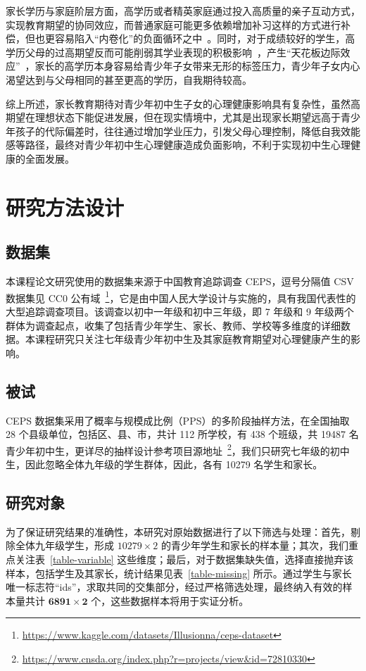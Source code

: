 \documentclass[zihao = -4, linespread = 1.5]{article}
\begin{document}
家长学历与家庭阶层方面，高学历或者精英家庭通过投入高质量的亲子互动方式，实现教育期望的协同效应，而普通家庭可能更多依赖增加补习这样的方式进行补偿，但也更容易陷入“内卷化”的负面循环之中~\citep{WangJianWu}。同时，对于成绩较好的学生，高学历父母的过高期望反而可能削弱其学业表现的积极影响~\citep{LiJiaZhe}，产生“天花板边际效应”~\citep{Tichenor}，家长的高学历本身容易给青少年子女带来无形的标签压力，青少年子女内心渴望达到与父母相同的甚至更高的学历，自我期待较高。

综上所述，家长教育期待对青少年初中生子女的心理健康影响具有复杂性，虽然高期望在理想状态下能促进发展，但在现实情境中，尤其是出现家长期望远高于青少年孩子的代际偏差时，往往通过增加学业压力，引发父母心理控制，降低自我效能感等路径，最终对青少年初中生心理健康造成负面影响，不利于实现初中生心理健康的全面发展。



\section{研究方法设计}
\subsection{数据集}
本课程论文研究使用的数据集来源于中国教育追踪调查 CEPS，逗号分隔值 CSV 数据集见 CC0 公有域~\footnote{\href{https://www.kaggle.com/datasets/illusionna/ceps-dataset}{https://www.kaggle.com/datasets/Illusionna/ceps-dataset}}，它是由中国人民大学设计与实施的，具有我国代表性的大型追踪调查项目。该调查以初中一年级和初中三年级，即 7 年级和 9 年级两个群体为调查起点，收集了包括青少年学生、家长、教师、学校等多维度的详细数据。本课程研究只关注七年级青少年初中生及其家庭教育期望对心理健康产生的影响。



\subsection{被试}
CEPS 数据集采用了概率与规模成比例（PPS）的多阶段抽样方法，在全国抽取 28 个县级单位，包括区、县、市，共计 112 所学校，有 438 个班级，共 19487 名青少年初中生，更详尽的抽样设计参考项目源地址~\footnote{\href{https://www.cnsda.org/index.php?r=projects/view&id=72810330}{https://www.cnsda.org/index.php?r=projects/view\&id=72810330}}，我们只研究七年级的初中生，因此忽略全体九年级的学生群体，因此，各有 10279 名学生和家长。



\subsection{研究对象}
为了保证研究结果的准确性，本研究对原始数据进行了以下筛选与处理：首先，剔除全体九年级学生，形成 $10279\times2$ 的青少年学生和家长的样本量；其次，我们重点关注表~\ref{table-variable} 这些维度；最后，对于数据集缺失值，选择直接抛弃该样本，包括学生及其家长，统计结果见表~\ref{table-missing} 所示。通过学生与家长唯一标志符“ids”，求取共同的交集部分，经过严格筛选处理，最终纳入有效的样本量共计 $\bm{6891\times2}$ 个，这些数据样本将用于实证分析。
\end{document}
